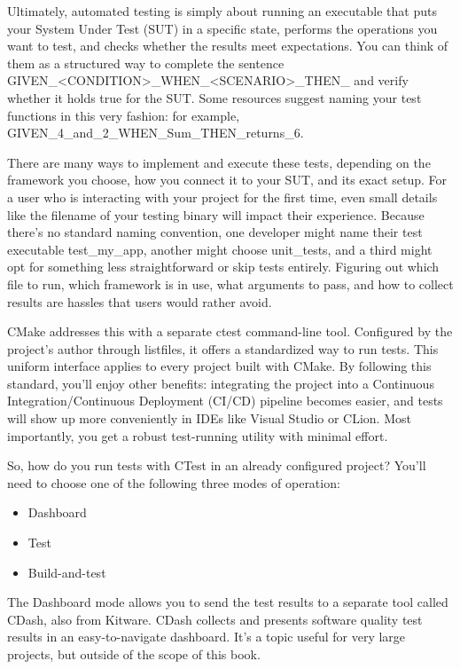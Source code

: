 
Ultimately, automated testing is simply about running an executable that puts your System Under Test (SUT) in a specific state, performs the operations you want to test, and checks whether the results meet expectations. You can think of them as a structured way to complete the sentence GIVEN\_<CONDITION>\_WHEN\_<SCENARIO>\_THEN\_<EXPECTED-OUTCOME> and verify whether it holds true for the SUT. Some resources suggest naming your test functions in this very fashion: for example, GIVEN\_4\_and\_2\_WHEN\_Sum\_THEN\_returns\_6.

There are many ways to implement and execute these tests, depending on the framework you choose, how you connect it to your SUT, and its exact setup. For a user who is interacting with your project for the first time, even small details like the filename of your testing binary will impact their experience. Because there’s no standard naming convention, one developer might name their test executable test\_my\_app, another might choose unit\_tests, and a third might opt for something less straightforward or skip tests entirely. Figuring out which file to run, which framework is in use, what arguments to pass, and how to collect results are hassles that users would rather avoid.

CMake addresses this with a separate ctest command-line tool. Configured by the project’s author through listfiles, it offers a standardized way to run tests. This uniform interface applies to every project built with CMake. By following this standard, you’ll enjoy other benefits: integrating the project into a Continuous Integration/Continuous Deployment (CI/CD) pipeline becomes easier, and tests will show up more conveniently in IDEs like Visual Studio or CLion. Most importantly, you get a robust test-running utility with minimal effort.

So, how do you run tests with CTest in an already configured project? You’ll need to choose one of the following three modes of operation:

\begin{itemize}
\item
Dashboard

\item
Test

\item
Build-and-test
\end{itemize}

The Dashboard mode allows you to send the test results to a separate tool called CDash, also from Kitware. CDash collects and presents software quality test results in an easy-to-navigate dashboard. It’s a topic useful for very large projects, but outside of the scope of this book.

